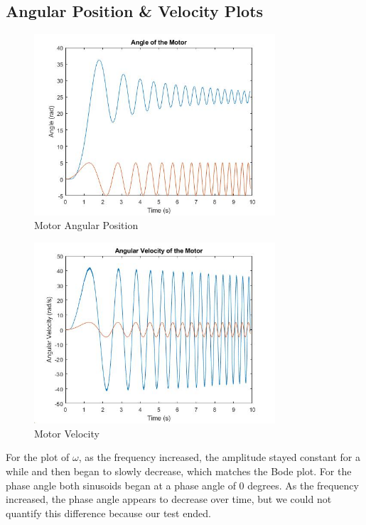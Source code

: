 \subsection{Angular Position \& Velocity Plots}

\begin{figure}[H]
	\centering
	\includegraphics[width=0.8\textwidth]{./figures/lab2_theta_with_input.jpg}
	\caption{Motor Angular Position}
	\label{fig:}
\end{figure}

\begin{figure}[H]
	\centering
	\includegraphics[width=0.8\textwidth]{./figures/lab2_omega_with_input.jpg}
	\caption{Motor Velocity}
	\label{fig:}
\end{figure}

For the plot of $\omega$, as the frequency increased, the amplitude stayed constant for a while and then began to slowly decrease, which matches the Bode plot. For the phase angle both sinusoids began at a phase angle of 0 degrees. As the frequency increased, the phase angle appears to decrease over time, but we could not quantify this difference because our test ended. 

